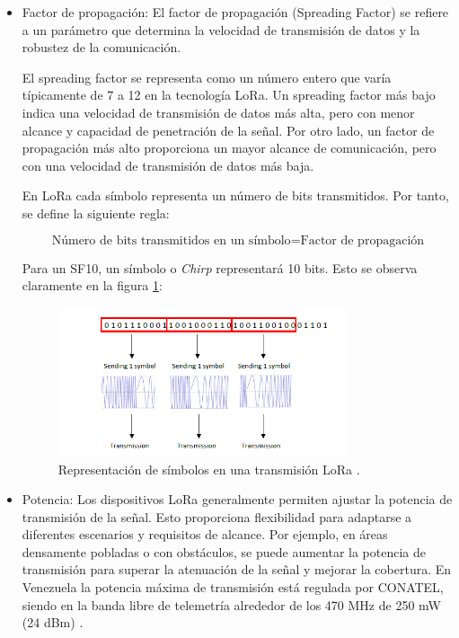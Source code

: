 \begin{itemize}
    \item Factor de propagación: El factor de propagación (Spreading Factor) se refiere a un parámetro que determina la velocidad de transmisión de datos y la robustez de la comunicación.

    El spreading factor se representa como un número entero que varía típicamente de 7 a 12 en la tecnología LoRa. Un spreading factor más bajo indica una velocidad de transmisión de datos más alta, pero con menor alcance y capacidad de penetración de la señal. Por otro lado, un factor de propagación más alto proporciona un mayor alcance de comunicación, pero con una velocidad de transmisión de datos más baja.
    
    En LoRa cada símbolo representa un número de bits transmitidos. Por tanto, se define la siguiente regla:

    \begin{equation}
        \text{Número de bits transmitidos en un símbolo} = \text{Factor de propagación}
    \end{equation}

     Para un SF10, un símbolo o \textit{Chirp} representará 10 bits. Esto se observa claramente en la figura \ref{fig:spreadingfactor}:

     \begin{figure}[H]
        \centering
        \includegraphics[width = 0.8\textwidth]{imagenes/cap1_marcoteo/SpreadingFactor.png}
        \caption{Representación de símbolos en una transmisión LoRa \citep{aloufi2020hybrid}.}
        \label{fig:spreadingfactor}
    \end{figure}
    
    \item Potencia: Los dispositivos LoRa generalmente permiten ajustar la potencia de transmisión de la señal. Esto proporciona flexibilidad para adaptarse a diferentes escenarios y requisitos de alcance. Por ejemplo, en áreas densamente pobladas o con obstáculos, se puede aumentar la potencia de transmisión para superar la atenuación de la señal y mejorar la cobertura. En Venezuela la potencia máxima de transmisión está regulada por CONATEL, siendo en la banda libre de telemetría alrededor de los 470 MHz de 250 mW (24 dBm) \citep{conatel}.
    

\end{itemize}
